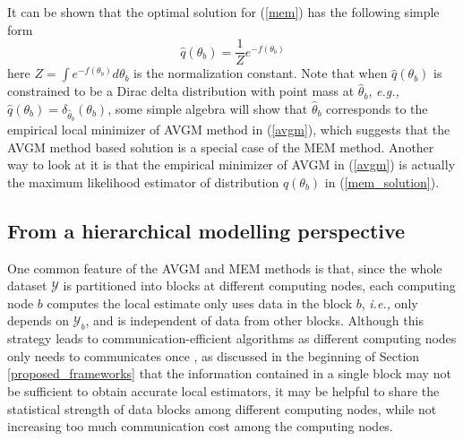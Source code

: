 \documentclass{article}
\newcommand{\ie}[0]{\emph{i.e., }}
\newcommand{\eg}[0]{\emph{e.g., }}
\newcommand{\1}[0]{\ensuremath{\boldsymbol{1}}\xspace}
\begin{document}
It can be shown that the optimal solution for (\ref{mem}) has the following simple form
\begin{equation}\label{mem_solution}
\hat q(\theta_b) = \frac{1}{Z}e^{-f(\theta_b)}
\end{equation}
here $Z = \int e^{-f(\theta_b)} d\theta_b$ is the normalization constant. Note that when $\hat q(\theta_b)$ is constrained to be a Dirac delta distribution with point mass at $\hat\theta_b$, \eg $\hat q(\theta_b) = \delta_{\hat\theta_b}(\theta_b)$, some simple algebra will show that $\hat\theta_b$ corresponds to the empirical local minimizer of AVGM method in (\ref{avgm}), which suggests that the AVGM method based solution is a special case of the MEM method. Another way to look at it is that the empirical minimizer of AVGM in (\ref{avgm}) is actually the maximum likelihood estimator of distribution $\hat q(\theta_b)$ in (\ref{mem_solution}).

\subsection{From a hierarchical modelling perspective}\label{HM}

One common feature of the AVGM and MEM methods is that, since the whole dataset $\mathcal{Y}$ is partitioned into blocks at different computing nodes, each computing node $b$ computes the local estimate only uses data in the block $b$, \ie only depends on $\mathcal{Y}_b$, and is independent of data from other blocks. Although this strategy leads to communication-efficient algorithms as different computing nodes only needs to communicates once \cite{YZhang2012}, as discussed in the beginning of Section \ref{proposed_frameworks} that the information contained in a single block may not be sufficient to obtain accurate local estimators, it may be helpful to share the statistical strength of data blocks among different computing nodes, while not increasing too much communication cost among the computing nodes.

\end{document}

